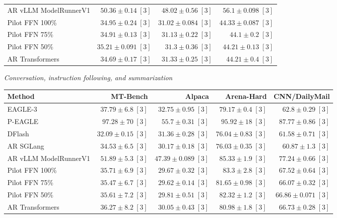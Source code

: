 \documentclass[conference,onecolumn]{IEEEtran}
\begin{document}
\begin{table}[!htp]
\begin{tabular}{@{}>{\raggedright\arraybackslash}p{3.7cm}rrr@{}}
AR \textperiodcentered{} vLLM ModelRunnerV1 & \(50.36 \pm 0.14\;[3]\) & \(48.02 \pm 0.56\;[3]\) & \(56.1 \pm 0.098\;[3]\) \\
Pilot FFN 100\% & \(34.95 \pm 0.24\;[3]\) & \(31.02 \pm 0.084\;[3]\) & \(44.33 \pm 0.087\;[3]\) \\
Pilot FFN 75\% & \(34.91 \pm 0.13\;[3]\) & \(31.13 \pm 0.22\;[3]\) & \(44.1 \pm 0.2\;[3]\) \\
Pilot FFN 50\% & \(35.21 \pm 0.091\;[3]\) & \(31.3 \pm 0.36\;[3]\) & \(44.21 \pm 0.13\;[3]\) \\
AR \textperiodcentered{} Transformers & \(34.69 \pm 0.17\;[3]\) & \(31.33 \pm 0.25\;[3]\) & \(44.21 \pm 0.4\;[3]\) \\
\bottomrule
\end{tabular}\par\medskip
\textit{Conversation, instruction following, and summarization}\par\smallskip
\begin{tabular}{@{}>{\raggedright\arraybackslash}p{3.7cm}rrrr@{}}
\toprule
Method & MT-Bench & Alpaca & Arena-Hard & CNN/DailyMail \\
\midrule
EAGLE-3 & \(37.79 \pm 6.8\;[3]\) & \(32.75 \pm 0.95\;[3]\) & \(79.17 \pm 0.4\;[3]\) & \(62.8 \pm 0.29\;[3]\) \\
P-EAGLE & \(97.28 \pm 70\;[3]\) & \(55.7 \pm 0.31\;[3]\) & \(95.92 \pm 18\;[3]\) & \(87.77 \pm 0.86\;[3]\) \\
DFlash & \(\mathbf{32.09} \pm 0.15\;[3]\) & \(31.36 \pm 0.28\;[3]\) & \(76.04 \pm 0.83\;[3]\) & \(61.58 \pm 0.71\;[3]\) \\
AR \textperiodcentered{} SGLang & \(34.53 \pm 6.5\;[3]\) & \(30.17 \pm 0.18\;[3]\) & \(\mathbf{76.03} \pm 0.35\;[3]\) & \(\mathbf{60.87} \pm 1.3\;[3]\) \\
AR \textperiodcentered{} vLLM ModelRunnerV1 & \(51.89 \pm 5.3\;[3]\) & \(47.39 \pm 0.089\;[3]\) & \(85.33 \pm 1.9\;[3]\) & \(77.24 \pm 0.66\;[3]\) \\
Pilot FFN 100\% & \(35.71 \pm 6.9\;[3]\) & \(29.67 \pm 0.32\;[3]\) & \(83.3 \pm 2.8\;[3]\) & \(67.52 \pm 0.64\;[3]\) \\
Pilot FFN 75\% & \(35.47 \pm 6.7\;[3]\) & \(\mathbf{29.62} \pm 0.14\;[3]\) & \(81.65 \pm 0.98\;[3]\) & \(66.07 \pm 0.32\;[3]\) \\
Pilot FFN 50\% & \(35.61 \pm 7.2\;[3]\) & \(29.81 \pm 0.51\;[3]\) & \(82.32 \pm 1.2\;[3]\) & \(66.86 \pm 0.071\;[3]\) \\
AR \textperiodcentered{} Transformers & \(36.27 \pm 8.2\;[3]\) & \(30.05 \pm 0.43\;[3]\) & \(80.98 \pm 1.8\;[3]\) & \(66.73 \pm 0.28\;[3]\) \\

\end{tabular}
\end{table}
\end{document}
